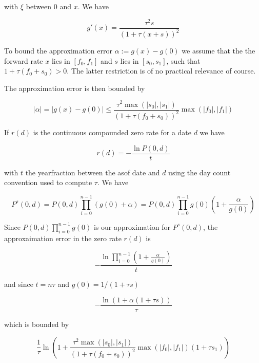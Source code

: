 \documentclass[12pt, a4paper]{article}
\begin{document}
with $\xi$ between $0$ and $x$. We have

\begin{equation}
  g'(x) = \frac{\tau^2s}{(1+\tau(x+s))^2}
\end{equation}

To bound the approximation error $\alpha := g(x) - g(0)$ we assume that the the forward rate $x$ lies in $[f_0, f_1]$
and $s$ lies in $[s_0, s_1]$, such that $1+\tau (f_0 + s_0) > 0$. The latter restriction is of no practical relevance of
course.

The approximation error is then bounded by

\begin{equation}
  | \alpha | =| g(x) - g(0) | \leq \frac{\tau^2 \max(|s_0|, |s_1|)}{(1+\tau(f_0+s_0))^2} \max(|f_0|, |f_1|)
\end{equation}

If $r(d)$ is the continuous compounded zero rate for a date $d$ we have

\begin{equation}
 r(d) = - \frac{\ln P(0,d)}{t}
\end{equation}

with $t$ the yearfraction between the asof date and $d$ using the day count convention used to compute $\tau$. We have

\begin{equation}
P^s(0,d) = P(0,d) \prod_{i=0}^{n-1} (g(0) + \alpha) = P(0,d) \prod_{i=0}^{n-1} g(0) \left( 1 + \frac{\alpha}{g(0)} \right)
\end{equation}

Since $P(0,d) \prod_{i=0}^{n-1} g(0)$ is our approximation for $P^s(0,d)$, the approxaimation error in the zero rate
$r(d)$ is

\begin{equation}
-\frac{\ln \prod_{i=0}^{n-1}  \left( 1 + \frac{\alpha}{g(0)} \right)}{t}
\end{equation}

and since $t = n \tau$ and $g(0) = 1 / ( 1 + \tau s )$

\begin{equation}
 -\frac{ \ln ( 1 + \alpha ( 1+\tau s ))} { \tau }
\end{equation}

which is bounded by

\begin{equation}\label{error_bound}
  \frac{1}{\tau} \ln \left( 1 + \frac{\tau^2 \max(|s_0|, |s_1|)}{(1+\tau(f_0+s_0))^2} \max(|f_0|, |f_1|)  ( 1+\tau s_1 ) \right)
\end{equation}
\end{document}
